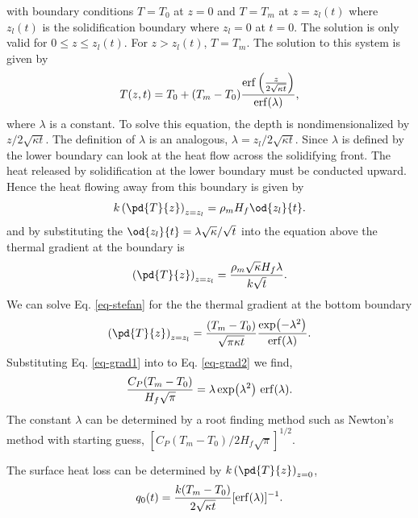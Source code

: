 \documentclass[final,12pt,a4paper]{article}
\begin{document}
with boundary conditions $T = T_{0}$ at $z = 0$ and $T = T_{m}$ at $z =
z_{l}(t)$ where $z_{l}(t)$ is the solidification boundary where $z_{l} = 0$
at $t = 0$.  The solution is only valid for $0 \leq z \leq z_{l}(t)$.
For $z > z_{l}(t)$, $T = T_{m}$.  The solution to this system is given
by
\begin{equation}
    T(z,t) = T_{0} + (T_{m} - T_{0})
        \frac{\erf\left(\frac{z}{2 \sqrt{\kappa t}}\right)}{\erf(\lambda)},
    \label{eq-stefan}
\end{equation}
where $\lambda$ is a constant.  To solve this equation, the depth is
nondimensionalized by $z/2 \sqrt{\kappa t}$.  The definition of
$\lambda$ is an analogous, $\lambda = z_{l}/2 \sqrt{\kappa t}$.  Since
$\lambda$ is defined by the lower boundary can look at the heat flow
across the solidifying front.  The heat released by solidification at
the lower boundary must be conducted upward.  Hence the heat flowing
away from this boundary is given by
\begin{equation}
    k \left( \pd{T}{z} \right)_{z = z_{l}} = \rho_{m} H_{f} \od{z_{l}}{t}.
\end{equation}
and by substituting the $\od{z_{l}}{t} = \lambda \sqrt{\kappa} /
\sqrt{t}$ into the equation above the thermal gradient at the boundary
is
\begin{equation}
    \left( \pd{T}{z} \right)_{z = z_{l}} =
        \frac{\rho_{m} \sqrt{\kappa} H_{f} \lambda}{k \sqrt{t}}.
    \label{eq-grad1}
\end{equation}
We can solve Eq. \ref{eq-stefan} for the the thermal gradient at the
bottom boundary
\begin{equation}
    \left( \pd{T}{z} \right)_{z = z_{l}} =
        \frac{(T_{m} - T_{0})}{\sqrt{\pi \kappa t}}
        \frac{\exp(-\lambda^2)}{\erf(\lambda)}.
    \label{eq-grad2}
\end{equation}
Substituting Eq. \ref{eq-grad1} into to Eq. \ref{eq-grad2} we find,
\begin{equation}
    \frac{C_{P} (T_{m} - T_{0})}{H_{f} \sqrt{\pi}} = 
        \lambda \exp(\lambda^2)\, \erf(\lambda).
\end{equation}
The constant $\lambda$ can be determined by a root finding method such
as Newton's method with starting guess, $[C_{P}(T_{m} - T_{0})/2 H_{f}
\sqrt{\pi}]^{1/2}$.

The surface heat loss can be determined by $k \left(\pd{T}{z}\right)_{z
= 0}$,
\begin{equation}
    q_{0}(t) = \frac{k (T_{m} - T_{0})}
        {2 \sqrt{\kappa t}} [\erf (\lambda)]^{-1}.
\end{equation}
\end{document}
